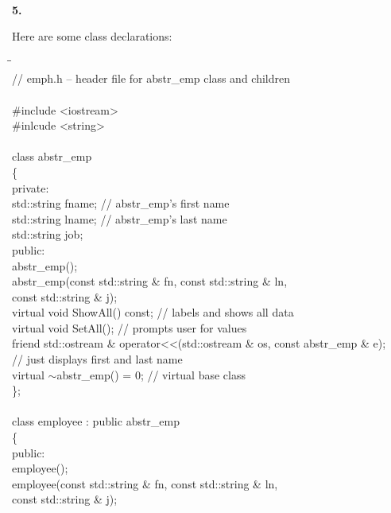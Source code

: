 \documentclass[10 pt]{amsart}
\newlength{\cwidth}
\newenvironment{cpart}[2][\cwidth]
	{%
		\\ %
		\textbf{#2. }%
		\begin{minipage}[t]{#1}%
		\setlength{\parindent}{0pt}%
		\setlength{\parskip}{2ex}%
	}
	{%
		\end{minipage}%
	}
\begin{document}
	\begin{cpart}{5}
		Here are some class declarations:
		{\ttfamily
			\begin{tabbing}
				\phantom{\qquad}\=\hspace{10ex}\=\hspace{8ex}\hspace{8ex}\= \\
				// emph.h -- header file for abstr\_emp class and children \\
				\\
				\#include <iostream> \\
				\#inlcude <string> \\
				\\
				class abstr\_emp \\
				\{
				\+ \\
				\< private: \\
					std::string fname; \> \> // abstr\_emp's first name \\
					std::string lname; \> \> // abstr\_emp's last name \\
					std::string job; \\
				\< public: \\
					abstr\_emp(); \\
					abstr\_emp(const std::string \& fn, const std::string \&
						ln, \\
					\phantom{abstr\_emp(}const std::string & j); \\
					virtual void ShowAll() const;   
						// labels and shows all data \\
					virtual void SetAll();     // prompts user for values \\
					friend std::ostream \& operator<<(std::ostream \&
						os, const abstr\_emp \& e); \\
					// just displays first and last name \\
					virtual $\sim$abstr\_emp() = 0;    // virtual base class \\
				\< \}; \\
				\- \\
				class employee : public abstr\_emp \\
				\{
				\+ \\
				\< public: \\
					employee(); \\
					employee(const std::string \& fn, const std::string
						\& ln, \\
					\phantom{employee(}const std::string & j); \\

\end{tabbing}}
\end{cpart}
\end{document}
